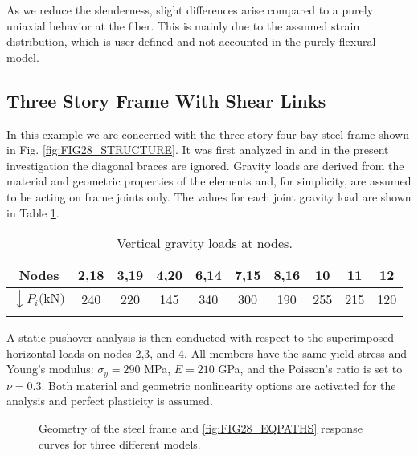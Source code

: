 As we reduce the slenderness, slight differences arise compared to a purely 
uniaxial behavior at the fiber. This is mainly due to the assumed strain 
distribution, which is user defined and not accounted in the purely flexural 
model. 


\subsection{Three Story Frame With Shear Links}

In this example we are concerned with the three-story four-bay steel frame 
shown in Fig. \ref{fig:FIG28_STRUCTURE}. It was first analyzed in 
\cite{Amir2022} and in the present investigation the diagonal braces are 
ignored. 
Gravity loads are 
derived from the material and geometric properties of the elements and, for 
simplicity, are assumed to be acting on frame joints only. The values for each 
joint gravity load are shown in Table \ref{table:TABLE10}. 

\begin{table}[h]
	\centering
	\begin{minipage}{0.7\linewidth}
		\caption{Vertical gravity loads at nodes.}
		\begin{tabular}{cccccccccc}
			\toprule\toprule
			Nodes                         & 2,18 & 3,19 & 4,20& 6,14 & 7,15 & 
			8,16 & 10 & 11 & 12 \\
			\midrule
			$\downarrow P_i \text{(kN)}$  & 240  & 220  & 145 & 340 & 300 & 190 
			& 255 & 215 & 120 \\
			\bottomrule\bottomrule
			\label{table:TABLE10}
		\end{tabular}
	\end{minipage}
\end{table}

A static pushover analysis is then conducted with respect to the 
superimposed horizontal loads on nodes 2,3, 
and 4. All members have 
the same yield stress and Young's modulus: $\sigma_y = 290$ MPa, $E = 210$ GPa, 
and the Poisson's ratio is set to $\nu= 0.3$. Both material and geometric 
nonlinearity options are activated for the 
analysis and perfect plasticity is assumed. 
\begin{figure}[H]
	\centering
	\caption{Geometry of the steel frame and \ref{fig:FIG28_EQPATHS} response 
		curves for three different models.}
	\label{fig:FIG28}
\end{figure}

